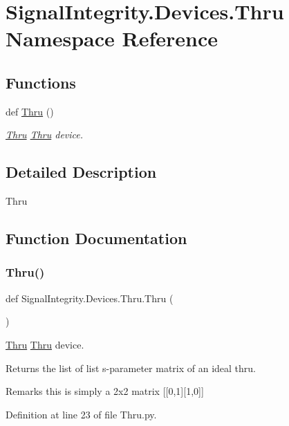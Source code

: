 \hypertarget{namespaceSignalIntegrity_1_1Devices_1_1Thru}{}\section{Signal\+Integrity.\+Devices.\+Thru Namespace Reference}
\label{namespaceSignalIntegrity_1_1Devices_1_1Thru}
\subsection*{Functions}
\begin{DoxyCompactItemize}
\item 
def \hyperlink{namespaceSignalIntegrity_1_1Devices_1_1Thru_abed0100f1a32fb286e8fd9a8341f4ed6}{Thru} ()
\begin{DoxyCompactList}\small\item\em \hyperlink{namespaceSignalIntegrity_1_1Devices_1_1Thru}{Thru} \hyperlink{namespaceSignalIntegrity_1_1Devices_1_1Thru}{Thru} device. \end{DoxyCompactList}\end{DoxyCompactItemize}


\subsection{Detailed Description}
\begin{DoxyVerb}Thru\end{DoxyVerb}
 

\subsection{Function Documentation}
\mbox{\label{namespaceSignalIntegrity_1_1Devices_1_1Thru_abed0100f1a32fb286e8fd9a8341f4ed6}} 
\subsubsection{\texorpdfstring{Thru()}{Thru()}}
{\footnotesize\ttfamily def Signal\+Integrity.\+Devices.\+Thru.\+Thru (\begin{DoxyParamCaption}{ }\end{DoxyParamCaption})}



\hyperlink{namespaceSignalIntegrity_1_1Devices_1_1Thru}{Thru} \hyperlink{namespaceSignalIntegrity_1_1Devices_1_1Thru}{Thru} device. 

\begin{DoxyReturn}{Returns}
the list of list s-\/parameter matrix of an ideal thru. 
\end{DoxyReturn}
\begin{DoxyRemark}{Remarks}
this is simply a 2x2 matrix \mbox{[}\mbox{[}0,1\mbox{]}\mbox{[}1,0\mbox{]}\mbox{]} 
\end{DoxyRemark}


Definition at line 23 of file Thru.\+py.

